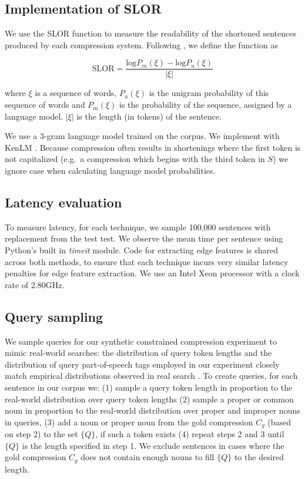 \subsection{Implementation of SLOR}

We use the SLOR function to measure the readability of the shortened sentences produced by each compression system. Following \cite{lau2015unsupervised}, we define the function as 

\begin{equation}
\text{SLOR}=\frac{\text{log}P_m(\xi) - \text{log}P_u(\xi)}{|\xi|}
\end{equation}

where $\xi$ is a sequence of words, $P_u(\xi)$ is the unigram probability of this sequence of words and $P_m(\xi)$ is the probability of the sequence, assigned by a language model.  $|\xi|$ is the length (in tokens) of the sentence.

We use a 3-gram language model trained on the \citet{filippova2013overcoming} corpus. We implement with KenLM \cite{Heafield-kenlm}. Because compression often results in shortenings where the first token is not capitalized (e.g.\ a compression which begins with the third token in $S$) we ignore case when calculating language model probabilities.

\subsection{Latency evaluation}
To measure latency, for each technique, we sample 100,000 sentences with replacement from the test test. We observe the mean time per sentence using Python's built in \textit{timeit} module. Code for extracting edge features is shared across both methods, to ensure that each technique incurs very similar latency penalties for edge feature extraction. We use an Intel Xeon processor with a clock rate of 2.80GHz. 

\subsection{Query sampling}
We sample queries for our synthetic constrained compression experiment to mimic real-world searches: the distribution of query token lengths and the distribution of query part-of-speech tags employed in our experiment closely match empirical distributions observed in real search \cite{Jansen2000RealLR,Barr2008TheLS}. To create queries, for each sentence in our corpus we: (1) sample a query token length in proportion to the real-world distribution over query token lengths (2) sample a proper or common noun in proportion to the real-world distribution over proper and improper nouns in queries, (3) add a noun or proper noun from the gold compression $C_g$ (based on step 2) to the set $\{Q\}$, if such a token exists (4) repeat steps 2 and 3 until $\{Q\}$ is the length specified in step 1. We exclude sentences in cases where the gold compression $C_g$ does not contain enough nouns to fill $\{Q\}$ to the desired length.

